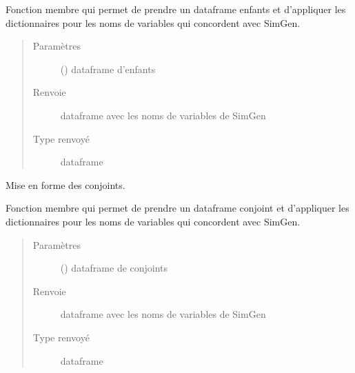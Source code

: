 \documentclass[letterpaper,10pt,french]{sphinxmanual}
\begin{document}
\begin{fulllineitems}
\begin{fulllineitems}
Fonction membre qui permet de prendre un dataframe enfants et d’appliquer les dictionnaires  pour les noms de variables qui concordent avec SimGen.
\begin{quote}\begin{description}
\item[{Paramètres}] \leavevmode
{} () \textendash{} dataframe d’enfants

\item[{Renvoie}] \leavevmode
dataframe avec les noms de variables de SimGen

\item[{Type renvoyé}] \leavevmode
dataframe

\end{description}\end{quote}

\end{fulllineitems}


\begin{fulllineitems}
\label{\detokenize{code:simgen.parse.spouses}}
Mise en forme des conjoints.

Fonction membre qui permet de prendre un dataframe conjoint et d’appliquer les dictionnaires  pour les noms de variables qui concordent avec SimGen.
\begin{quote}\begin{description}
\item[{Paramètres}] \leavevmode
{} () \textendash{} dataframe de conjoints

\item[{Renvoie}] \leavevmode
dataframe avec les noms de variables de SimGen

\item[{Type renvoyé}] \leavevmode
dataframe

\end{description}\end{quote}

\end{fulllineitems}


\end{fulllineitems}
\end{document}
